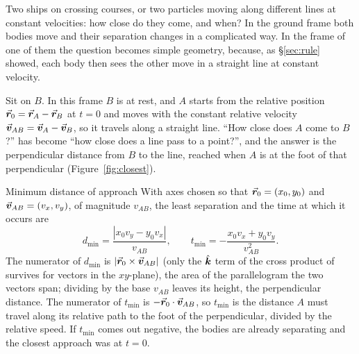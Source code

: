 Two ships on crossing courses, or two particles moving along different lines at constant velocities:
how close do they come, and when? In the ground frame both bodies move and their separation changes in
a complicated way. In the frame of one of them the question becomes simple geometry, because, as
\S\ref{sec:rule} showed, each body then sees the other move in a straight line at constant velocity.

Sit on $B$. In this frame $B$ is at rest, and $A$ starts from the relative position
$\vec{\bm{r}}_0=\vec{\bm{r}}_A-\vec{\bm{r}}_B$ at $t=0$ and moves with the constant relative velocity $\vec{\bm{v}}_{AB}=\vec{\bm{v}}_A-\vec{\bm{v}}_B$, so
it travels along a straight line. ``How close does $A$ come to $B$?'' has become ``how close does a line
pass to a point?'', and the answer is the perpendicular distance from $B$ to the line, reached when $A$
is at the foot of that perpendicular (Figure~\ref{fig:closest}).

\begin{keybox}{Minimum distance of approach}
With axes chosen so that $\vec{\bm{r}}_0=(x_0,y_0)$ and $\vec{\bm{v}}_{AB}=(v_x,v_y)$, of magnitude $v_{AB}$, the least
separation and the time at which it occurs are
\[
d_{\min}=\frac{|x_0v_y-y_0v_x|}{v_{AB}},\qquad t_{\min}=-\frac{x_0v_x+y_0v_y}{v_{AB}^2}.
\]
The numerator of $d_{\min}$ is $|\vec{\bm{r}}_0\times\vec{\bm{v}}_{AB}|$ (only the $\hat{\bm{k}}$ term of the cross product of
 survives for vectors in the $xy$-plane), the area of the parallelogram the two vectors span; dividing by the base $v_{AB}$ leaves its height, the perpendicular distance. The
numerator of $t_{\min}$ is $-\vec{\bm{r}}_0\cdot\vec{\bm{v}}_{AB}$, so $t_{\min}$ is the distance $A$ must travel along its
relative path to the foot of the perpendicular, divided by the relative speed. If $t_{\min}$ comes out
negative, the bodies are already separating and the closest approach was at $t=0$.
\end{keybox}

\begin{figure}[htbp]
\centering
{}
\end{figure}

